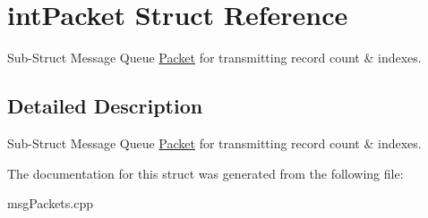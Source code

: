 \hypertarget{structintPacket}{\section{int\-Packet Struct Reference}
\label{structintPacket}
}


Sub-\/\-Struct Message Queue \hyperlink{structPacket}{Packet} for transmitting record count \& indexes.  




\subsection{Detailed Description}
Sub-\/\-Struct Message Queue \hyperlink{structPacket}{Packet} for transmitting record count \& indexes. 

The documentation for this struct was generated from the following file\-:\begin{DoxyCompactItemize}
\item 
msg\-Packets.\-cpp\end{DoxyCompactItemize}
